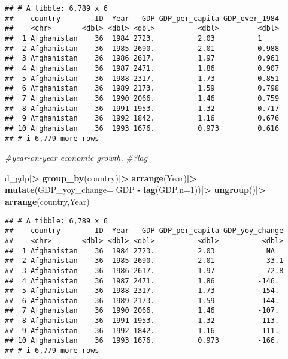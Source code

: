 \documentclass[
]{article}
\newenvironment{Shaded}{\begin{snugshade}}{\end{snugshade}}
\newcommand{\AttributeTok}[1]{\textcolor[rgb]{0.13,0.29,0.53}{#1}}
\newcommand{\CommentTok}[1]{\textcolor[rgb]{0.56,0.35,0.01}{\textit{#1}}}
\newcommand{\DecValTok}[1]{\textcolor[rgb]{0.00,0.00,0.81}{#1}}
\newcommand{\FunctionTok}[1]{\textcolor[rgb]{0.13,0.29,0.53}{\textbf{#1}}}
\newcommand{\NormalTok}[1]{#1}
\newcommand{\SpecialCharTok}[1]{\textcolor[rgb]{0.81,0.36,0.00}{\textbf{#1}}}
\begin{document}
\begin{verbatim}
## # A tibble: 6,789 x 6
##    country        ID  Year   GDP GDP_per_capita GDP_over_1984
##    <chr>       <dbl> <dbl> <dbl>          <dbl>         <dbl>
##  1 Afghanistan    36  1984 2723.          2.03          1    
##  2 Afghanistan    36  1985 2690.          2.01          0.988
##  3 Afghanistan    36  1986 2617.          1.97          0.961
##  4 Afghanistan    36  1987 2471.          1.86          0.907
##  5 Afghanistan    36  1988 2317.          1.73          0.851
##  6 Afghanistan    36  1989 2173.          1.59          0.798
##  7 Afghanistan    36  1990 2066.          1.46          0.759
##  8 Afghanistan    36  1991 1953.          1.32          0.717
##  9 Afghanistan    36  1992 1842.          1.16          0.676
## 10 Afghanistan    36  1993 1676.          0.973         0.616
## # i 6,779 more rows
\end{verbatim}

\begin{Shaded}
\begin{Highlighting}[]
\CommentTok{\#year{-}on{-}year economic growth.}
\CommentTok{\#?lag}

\NormalTok{d\_gdp}\SpecialCharTok{|\textgreater{}}
  \FunctionTok{group\_by}\NormalTok{(country)}\SpecialCharTok{|\textgreater{}}
  \FunctionTok{arrange}\NormalTok{(Year)}\SpecialCharTok{|\textgreater{}}
  \FunctionTok{mutate}\NormalTok{(}\AttributeTok{GDP\_yoy\_change=}\NormalTok{ GDP }\SpecialCharTok{{-}} \FunctionTok{lag}\NormalTok{(GDP,}\AttributeTok{n=}\DecValTok{1}\NormalTok{))}\SpecialCharTok{|\textgreater{}}
  \FunctionTok{ungroup}\NormalTok{()}\SpecialCharTok{|\textgreater{}}
  \FunctionTok{arrange}\NormalTok{(country,Year)}
\end{Highlighting}
\end{Shaded}

\begin{verbatim}
## # A tibble: 6,789 x 6
##    country        ID  Year   GDP GDP_per_capita GDP_yoy_change
##    <chr>       <dbl> <dbl> <dbl>          <dbl>          <dbl>
##  1 Afghanistan    36  1984 2723.          2.03            NA  
##  2 Afghanistan    36  1985 2690.          2.01           -33.1
##  3 Afghanistan    36  1986 2617.          1.97           -72.8
##  4 Afghanistan    36  1987 2471.          1.86          -146. 
##  5 Afghanistan    36  1988 2317.          1.73          -154. 
##  6 Afghanistan    36  1989 2173.          1.59          -144. 
##  7 Afghanistan    36  1990 2066.          1.46          -107. 
##  8 Afghanistan    36  1991 1953.          1.32          -113. 
##  9 Afghanistan    36  1992 1842.          1.16          -111. 
## 10 Afghanistan    36  1993 1676.          0.973         -166. 
## # i 6,779 more rows
\end{verbatim}
\end{document}
